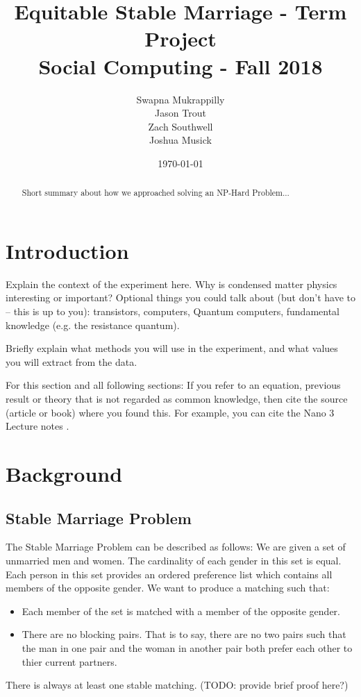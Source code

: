 \documentclass[a4paper]{article}
\title{Equitable Stable Marriage - Term Project\\Social Computing - Fall 2018}
\author{Swapna Mukrappilly\\Jason Trout\\Zach Southwell\\Joshua Musick}
\date{\today}
\begin{document}
\maketitle

\begin{abstract}
Short summary about how we approached solving an NP-Hard Problem...
\end{abstract}

\section{Introduction}
\label{sec:introduction}

Explain the context of the experiment here. Why is condensed matter physics interesting or important?
Optional things you could talk about (but don't have to -- this is up to you): transistors, computers, Quantum computers, fundamental knowledge (e.g. the resistance quantum).

Briefly explain what methods you will use in the experiment, and what values you will extract from the data.

For this section and all following sections: If you refer to an equation, previous result or theory that is not regarded as common knowledge, then cite the source (article or book) where you found this. For example, you can cite the Nano 3 Lecture notes \cite{nano3}.


\section{Background}
\label{sec:background}

\subsection{Stable Marriage Problem}
The Stable Marriage Problem can be described as follows: We are given a set of unmarried men and women. The cardinality of each gender in this set is equal. Each person in this set provides an ordered preference list which contains all members of the opposite gender. We want to produce a matching such that:
\begin{itemize}
    \item Each member of the set is matched with a member of the opposite gender.
    \item There are no blocking pairs. That is to say, there are no two pairs such that the man in one pair and the woman in another pair both prefer each other to thier current partners.
\end{itemize}
There is always at least one stable matching. (TODO: provide brief proof here?)
\end{document}
